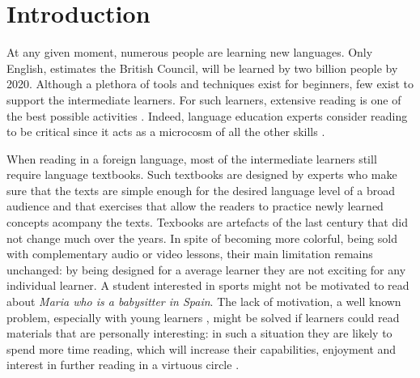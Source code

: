 
\section{Introduction}
At any given moment, numerous people are learning new languages. 
Only English, estimates the British Council, will be learned by two billion people by 2020. 
Although a plethora of tools and techniques exist for beginners, few exist to support the intermediate learners. For such learners, extensive reading is one of the best possible activities \cite{Day98-Extensive,mccarthy1999-extensive}. 
Indeed, language education experts consider reading to be critical since it acts as a microcosm of all the other skills \cite{mccarthy1999-microcosm}. 


When reading in a foreign language, most of the intermediate learners still require language textbooks. Such textbooks are designed by experts who make sure that the texts are simple enough for the desired language level of a broad audience and that exercises that allow the readers to practice newly learned concepts acompany the texts. Texbooks are artefacts of the last century that did not change much over the years. In spite of becoming more colorful, being sold with complementary audio or video lessons, their main limitation remains unchanged: 
by being designed for a average learner they are not exciting for any individual learner. A student interested in sports might not be motivated to read about {\em Maria who is a babysitter in Spain}. The lack of motivation, a well known problem, especially with young learners \cite{Hidi00-TheUnmotivated}, might be solved if learners could read materials that are personally interesting: in such a situation they are likely to spend more time reading, which will increase their capabilities, enjoyment and interest in further reading in a virtuous circle \cite{Brozo07-Engagement, Guthrie99-Motivation}.

